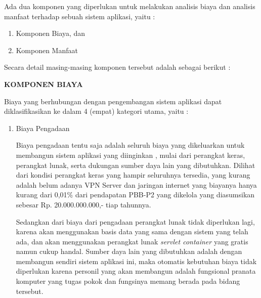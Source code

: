 \documentclass[pdftex, 12pt, oneside]{article}
\begin{document}
Ada dua komponen yang diperlukan untuk melakukan analisis biaya dan analisis manfaat terhadap sebuah sistem aplikasi, yaitu :

\begin{enumerate}[1.]
  \item Komponen Biaya, dan
  \item Komponen Manfaat
\end{enumerate}

Secara detail masing-masing komponen tersebut adalah sebagai berikut :

\textbf{KOMPONEN BIAYA}

Biaya yang berhubungan dengan pengembangan sistem aplikasi dapat diklasifikasikan ke dalam 4 (empat) kategori utama, yaitu :

\begin{enumerate}[1.]
  \item Biaya Pengadaan
  
  Biaya pengadaan tentu saja adalah seluruh biaya yang dikeluarkan untuk membangun sistem aplikasi yang diinginkan , mulai dari perangkat keras, perangkat lunak, serta dukungan sumber daya lain yang dibutuhkan. Dilihat dari kondisi perangkat keras yang hampir seluruhnya tersedia, yang kurang adalah belum adanya VPN Server dan jaringan internet yang biayanya hanya kurang dari 0,01\% dari pendapatan PBB-P2 yang dikelola yang diasumsikan sebesar Rp. 20.000.000.000,- tiap tahunnya.
  
  Sedangkan dari biaya dari pengadaan perangkat lunak tidak diperlukan lagi, karena akan menggunakan basis data yang sama dengan sistem yang telah ada, dan akan menggunakan perangkat lunak \textit{servlet container} yang gratis namun cukup handal. Sumber daya lain yang dibutuhkan adalah dengan membangun sendiri sistem aplikasi ini, maka otomatis kebutuhan biaya tidak diperlukan karena personil yang akan membangun adalah fungsional pranata komputer yang tugas pokok dan fungsinya memang berada pada bidang tersebut.
  

\end{enumerate}
\end{document}
